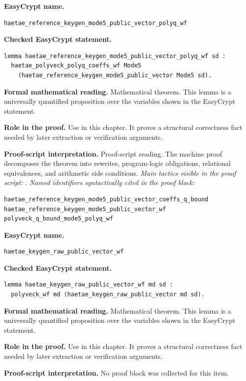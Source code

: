 \begin{formaltheorem}
\noindent\textbf{EasyCrypt name.}
\begin{lstlisting}[language=EasyCrypt,basicstyle=\ttfamily\scriptsize]
haetae_reference_keygen_mode5_public_vector_polyq_wf
\end{lstlisting}
\noindent\textbf{Checked EasyCrypt statement.}
\begin{lstlisting}[language=EasyCrypt,basicstyle=\ttfamily\scriptsize]
lemma haetae_reference_keygen_mode5_public_vector_polyq_wf sd :
  haetae_polyveck_polyq_coeffs_wf Mode5
    (haetae_reference_keygen_mode5_public_vector Mode5 sd).
\end{lstlisting}
\noindent\textbf{Formal mathematical reading.}
Mathematical theorem. This lemma is a universally quantified proposition over the variables shown in the EasyCrypt statement.

\noindent\textbf{Role in the proof.}
Use in this chapter. It proves a structural correctness fact needed by later extraction or verification arguments.

\noindent\textbf{Proof-script interpretation.}
Proof-script reading. The machine proof decomposes the theorem into rewrites, program-logic obligations, relational equivalences, and arithmetic side conditions.
\emph{Main tactics visible in the proof script:} .
\emph{Named identifiers syntactically cited in the proof block:}
\begin{lstlisting}[language=EasyCrypt,basicstyle=\ttfamily\scriptsize]
haetae_reference_keygen_mode5_public_vector_coeffs_q_bound
haetae_reference_keygen_mode5_public_vector_wf
polyveck_q_bound_mode5_polyq_wf
\end{lstlisting}

\end{formaltheorem}

\begin{formaltheorem}
\noindent\textbf{EasyCrypt name.}
\begin{lstlisting}[language=EasyCrypt,basicstyle=\ttfamily\scriptsize]
haetae_keygen_raw_public_vector_wf
\end{lstlisting}
\noindent\textbf{Checked EasyCrypt statement.}
\begin{lstlisting}[language=EasyCrypt,basicstyle=\ttfamily\scriptsize]
lemma haetae_keygen_raw_public_vector_wf md sd :
  polyveck_wf md (haetae_keygen_raw_public_vector md sd).
\end{lstlisting}
\noindent\textbf{Formal mathematical reading.}
Mathematical theorem. This lemma is a universally quantified proposition over the variables shown in the EasyCrypt statement.

\noindent\textbf{Role in the proof.}
Use in this chapter. It proves a structural correctness fact needed by later extraction or verification arguments.

\noindent\textbf{Proof-script interpretation.}
No proof block was collected for this item.

\end{formaltheorem}

